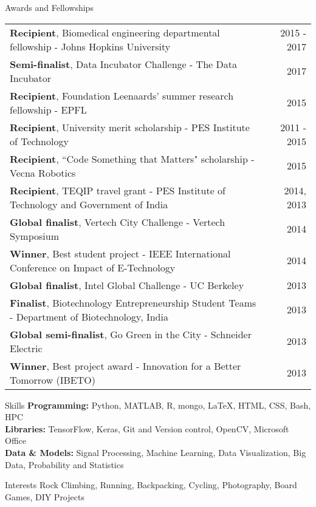\documentclass{resume}
\begin{document}
        \begin{rSection}{Awards and Fellowships}
\begin{tabular*}{\textwidth}{@{\extracolsep{\fill}}lr@{}}
\textbf{Recipient}, Biomedical engineering departmental fellowship - Johns Hopkins University & 2015 - 2017\\ 
\textbf{Semi-finalist}, Data Incubator Challenge - The Data Incubator & 2017\\
\textbf{Recipient}, Foundation Leenaards' summer research fellowship - EPFL &  2015\\
\textbf{Recipient}, University merit scholarship - PES Institute of Technology & 2011 - 2015 \\ 
\textbf{Recipient}, ``Code Something that Matters" scholarship - Vecna Robotics & 2015\\
\textbf{Recipient}, TEQIP travel grant - PES Institute of Technology and Government of India& 2014, 2013 \\ 
\textbf{Global finalist}, Vertech City Challenge - Vertech Symposium  & 2014\\
\textbf{Winner}, Best student project - IEEE International Conference on Impact of E-Technology & 2014\\
\textbf{Global finalist}, Intel Global Challenge -  UC Berkeley & 2013 \\
\textbf{Finalist}, Biotechnology Entrepreneurship Student Teams - Department of Biotechnology, India & 2013\\
\textbf{Global semi-finalist}, Go Green in the City - Schneider Electric & 2013 \\
\textbf{Winner}, Best project award - Innovation for a Better Tomorrow (IBETO)  & 2013\\
\end{tabular*}
    \end{rSection}

\vspace{1em}

    \begin{rSection}{Skills}
\textbf{Programming:} Python, MATLAB, R, mongo, \LaTeX, HTML, CSS, Bash, HPC\\
\textbf{Libraries:} TensorFlow, Keras, Git and Version control, OpenCV, Microsoft Office \\
\textbf{Data \& Models:} Signal Processing, Machine Learning, Data Visualization, Big Data, Probability and Statistics
\end{rSection} 


\vspace{1em}

\begin{rSection}{Interests}
Rock Climbing, Running, Backpacking, Cycling, Photography, Board Games, DIY Projects
\end{rSection} 



\end{document}
